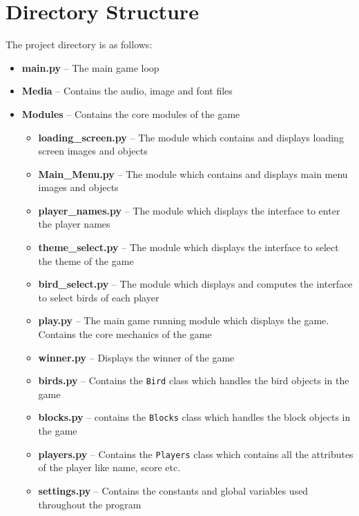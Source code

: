 \documentclass{article}
\begin{document}
\section{Directory Structure}\label{sec:dir}
The project directory is as follows:


\begin{itemize}
    \item \textbf{main.py} -- The main game loop
    \item \textbf{Media} -- Contains the audio, image and font files
    \item \textbf{Modules} -- Contains the core modules of the game 
    \begin{itemize}
        \item \textbf{loading\_screen.py} -- The module which contains and displays loading screen images and objects 
        \item \textbf{Main\_Menu.py} -- The module which contains and displays main menu images and objects
        \item \textbf{player\_names.py} -- The module which displays the interface to enter the player names
        \item \textbf{theme\_select.py} -- The module which displays the interface to select the theme of the game
        \item \textbf{bird\_select.py} -- The module which displays and computes the interface to select birds of each player
        \item \textbf{play.py} -- The main game running module which displays the game. Contains the core mechanics of the game
        \item \textbf{winner.py} -- Displays the winner of the game
        \item \textbf{birds.py} -- Contains the \texttt{Bird} class which handles the bird objects in the game
        \item \textbf{blocks.py} -- contains the \texttt{Blocks} class which handles the block objects in the game
        \item \textbf{players.py} -- Contains the \texttt{Players} class which contains all the attributes of the player like name, score etc.
        \item \textbf{settings.py} -- Contains the constants and global variables used throughout the program
    \end{itemize}
    
\end{itemize}
\end{document}
